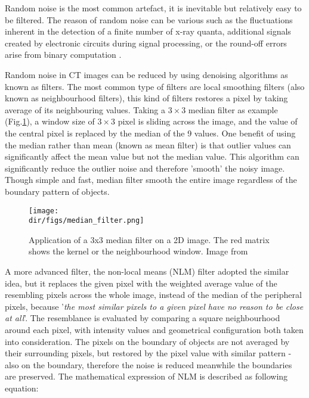Random noise is the most common artefact, it is inevitable but relatively easy to be filtered. The reason of random noise can be various such as the fluctuations inherent in the detection of a finite number of x-ray quanta, additional signals created by electronic circuits during signal processing, or the round-off errors arise from binary computation \citep{hanson1981radiology}.

Random noise in CT images can be reduced by using denoising algorithms as known as filters. The most common type of filters are local smoothing filters (also known as neighbourhood filters), this kind of filters restores a pixel by taking average of its neighbouring values. Taking a $3\times3$ median filter \citep{huang1979fast} as example (Fig.\ref{median}), a window size of $3\times3$ pixel is sliding across the image, and the value of the central pixel is replaced by the median of the 9 values. One benefit of using the median rather than mean (known as mean filter) is that outlier values can significantly affect the mean value but not the median value. This algorithm can significantly reduce the outlier noise and therefore 'smooth' the noisy image. Though simple and fast, median filter smooth the entire image regardless of the boundary pattern of objects. 

\begin{figure}[htbp]
  \centering
  \texttt{[image: \\dir/figs/median\_filter.png]}
  \caption{Application of a 3x3 median filter on a 2D image. The red matrix shows the kernel or the neighbourhood window. Image from \cite{Pak2014thesis}}
  \label{median}
\end{figure}

A more advanced filter, the non-local means (NLM) filter \citep{buades2011non} adopted the similar idea, but it replaces the given pixel with the weighted average value of the resembling pixels across the whole image, instead of the median of the peripheral pixels, because '\textit{the most similar pixels to a given pixel have no reason to be close at all}'. The resemblance is evaluated by comparing a square neighbourhood around each pixel, with intensity values and geometrical configuration both taken into consideration. The pixels on the boundary of objects are not averaged by their surrounding pixels, but restored by the pixel value with similar pattern - also on the boundary, therefore the noise is reduced meanwhile the boundaries are preserved. The mathematical expression of NLM is described as following equation:

